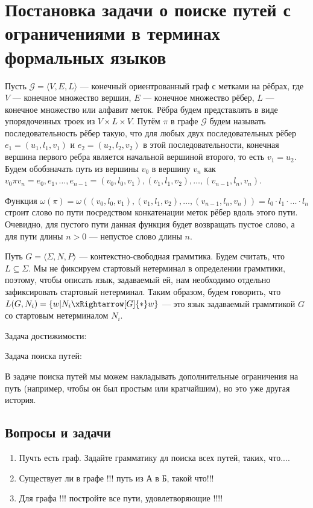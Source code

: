 \section{Постановка задачи о поиске путей с ограничениями в терминах формальных языков}

Пусть $\mathcal{G} = \langle V,E,L \rangle$ --- конечный ориентрованный граф с метками на рёбрах, где $V$ --- конечное множество вершин, $E$ --- конечное множество рёбер, $L$ --- конечное множество или алфавит меток.
Рёбра будем представлять в виде упорядоченных троек из $V \times L \times V$.
Путём $\pi$ в графе $\mathcal{G}$ будем называть последовательность рёбер такую, что для любых двух последовательных рёбер $e_1=(u_1,l_1,v_1)$ и $e_2=(u_2,l_2,v_2)$ в этой последовательности, конечная вершина первого ребра является начальной вершиной второго, то есть $v_1 = u_2$.
Будем обобзначать путь из вершины $v_0$ в вершину $v_n$ как $v_0 \pi v_n = e_0,e_1, \dots, e_{n-1} = (v_0, l_0, v_1),(v_1,l_1,v_2),\dots,(v_{n-1},l_n,v_n)$.

Функция $\omega(\pi) = \omega((v_0, l_0, v_1),(v_1,l_1,v_2),\dots,(v_{n-1},l_n,v_n)) = l_0 \cdot l_1 \cdot \ldots \cdot l_n $ строит слово по пути посредством конкатенации меток рёбер вдоль этого пути.
Очевидно, для пустого пути данная функция будет возвращать пустое слово, а для пути длины $n  > 0$ --- непустое слово длины $n$.

Путь $G = \langle \Sigma, N, P \rangle$ --- контекстно-свободная граммтика.
Будем считать, что $L \subseteq \Sigma$.
Мы не фиксируем стартовый нетерминал в определении граммтики, поэтому, чтобы описать язык, задаваемый ей, нам необходимо отдельно зафиксировать стартовый нетерминал.
Таким образом, будем говорить, что $L(G,N_i) = \{ w | N_i \xRightarrow[G]{*} w  \}$ --- это язык задаваемый граммтикой $G$ со стартовым нетерминалом $N_i$.

Задача достижимости:

Задача поиска путей:

В задаче поиска путей мы можем накладывать дополнительные ограничения на путь (например, чтобы он был простым или кратчайшим), но это уже другая история.


\subsection{Вопросы и задачи}
\begin{enumerate}
  \item Пучть есть граф. Задайте грамматику дл поиска всех путей, таких, что....
  \item Существует ли в графе !!! путь из А в Б, такой что!!!
  \item Для графа !!! постройте все пути, удовлетворяющие !!!!
\end{enumerate}
